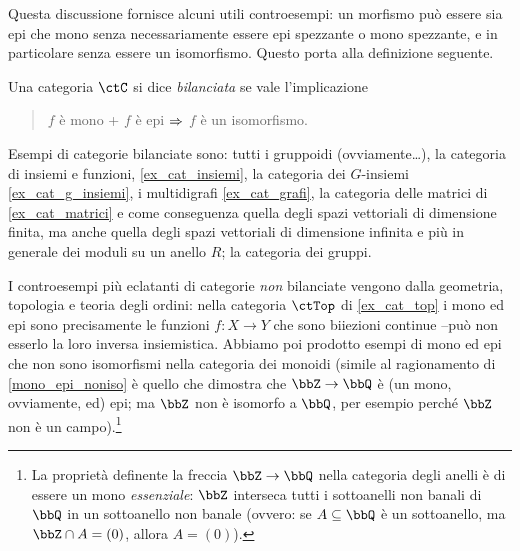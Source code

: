 Questa discussione fornisce alcuni utili controesempi:	un morfismo può essere sia epi che mono senza necessariamente essere epi spezzante o mono spezzante,	e in particolare senza essere un isomorfismo. Questo porta alla definizione seguente.
\begin{definition}\label{def_cat_bilanciata}
	Una categoria \(\ctC\) si dice \emph{bilanciata} se vale l'implicazione
	\begin{quote}
		\(f\) è mono + \(f\) è epi \(\To\) \(f\) è un isomorfismo.
	\end{quote}
\end{definition}
Esempi di categorie bilanciate sono: tutti i gruppoidi (ovviamente\dots), la categoria di insiemi e funzioni, \ref{ex_cat_insiemi}, la categoria dei \(G\)-insiemi \ref{ex_cat_g_insiemi}, i multidigrafi \ref{ex_cat_grafi}, la categoria delle matrici di \ref{ex_cat_matrici} e come conseguenza quella degli spazi vettoriali di dimensione finita, ma anche quella degli spazi vettoriali di dimensione infinita e più in generale dei moduli su un anello \(R\); la categoria dei gruppi.

I controesempi più eclatanti di categorie \emph{non} bilanciate vengono dalla geometria, topologia e teoria degli ordini: nella categoria \(\ctTop\) di \ref{ex_cat_top} i mono ed epi sono precisamente le funzioni \(f : X\to Y\) che sono biiezioni continue --può non esserlo la loro inversa insiemistica. Abbiamo poi prodotto esempi di mono ed epi che non sono isomorfismi nella categoria dei monoidi (simile al ragionamento di \ref{mono_epi_noniso} è quello che dimostra che \(\bbZ\to\bbQ\) è (un mono, ovviamente, ed) epi; ma \(\bbZ\) non è isomorfo a \(\bbQ\), per esempio perché \(\bbZ\) non è un campo).\footnote{La proprietà definente la freccia \(\bbZ\to\bbQ\) nella categoria degli anelli è di essere un mono \emph{essenziale}: \(\bbZ\) interseca tutti i sottoanelli non banali di \(\bbQ\) in un sottoanello non banale (ovvero: se \(A\subseteq\bbQ\) è un sottoanello, ma \(\bbZ\cap A=(0)\), allora \(A=(0)\)).}

